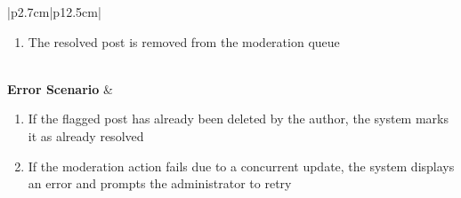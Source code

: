 \begin{table}[H]
\begin{tabular}{|p{2.7cm}|p{12.5cm}|}
\begin{minipage}[t]{\linewidth}
\begin{enumerate}[topsep=0pt,itemsep=1pt,parsep=0pt,partopsep=0pt]
                                          \item The resolved post is removed from the moderation queue
                                      \end{enumerate}
                                  \end{minipage}                                         \\ \hline
        \textbf{Error Scenario} & \begin{minipage}[t]{\linewidth}
                                      \begin{enumerate}[topsep=0pt,itemsep=1pt,parsep=0pt,partopsep=0pt]
                                          \item If the flagged post has already been deleted by the author, the system marks it
                                                as already resolved
                                          \item If the moderation action fails due to a concurrent update, the system displays
                                                an error and prompts the administrator to retry
                                      \end{enumerate}
                                  \end{minipage}                                        \\ \hline
    \end{tabular}
    \label{tab:admin-forum-moderation}
\end{table}
